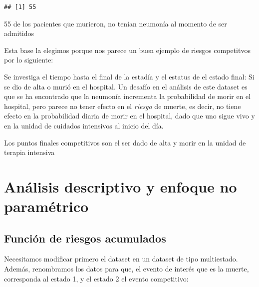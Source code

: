 \documentclass[
]{article}
\newenvironment{Shaded}{\begin{snugshade}}{\end{snugshade}}
\newcommand{\AttributeTok}[1]{\textcolor[rgb]{0.77,0.63,0.00}{#1}}
\newcommand{\CommentTok}[1]{\textcolor[rgb]{0.56,0.35,0.01}{\textit{#1}}}
\newcommand{\DecValTok}[1]{\textcolor[rgb]{0.00,0.00,0.81}{#1}}
\newcommand{\FunctionTok}[1]{\textcolor[rgb]{0.00,0.00,0.00}{#1}}
\newcommand{\NormalTok}[1]{#1}
\newcommand{\OtherTok}[1]{\textcolor[rgb]{0.56,0.35,0.01}{#1}}
\newcommand{\SpecialCharTok}[1]{\textcolor[rgb]{0.00,0.00,0.00}{#1}}
\newcommand{\StringTok}[1]{\textcolor[rgb]{0.31,0.60,0.02}{#1}}
\begin{document}
\begin{verbatim}
## [1] 55
\end{verbatim}

55 de los pacientes que murieron, no tenían neumonía al momento de ser
admitidos

Esta base la elegimos porque nos parece un buen ejemplo de riesgos
competitvos por lo siguiente:

Se investiga el tiempo hasta el final de la estadía y el estatus de el
estado final: Si se dio de alta o murió en el hospital. Un desafío en el
análisis de este dataset es que se ha encontrado que la neumonía
incrementa la probabilidad de morir en el hospital, pero parece no tener
efecto en el \emph{riesgo} de muerte, es decir, no tiene efecto en la
probabilidad diaria de morir en el hospital, dado que uno sigue vivo y
en la unidad de cuidados intensivos al inicio del día.

Los puntos finales competitivos son el ser dado de alta y morir en la
unidad de terapia intensiva

\hypertarget{anuxe1lisis-descriptivo-y-enfoque-no-paramuxe9trico}{%
\section{Análisis descriptivo y enfoque no
paramétrico}\label{anuxe1lisis-descriptivo-y-enfoque-no-paramuxe9trico}}

\hypertarget{funciuxf3n-de-riesgos-acumulados}{%
\subsection{Función de riesgos
acumulados}\label{funciuxf3n-de-riesgos-acumulados}}

Necesitamos modificar primero el dataset en un dataset de tipo
multiestado. Además, renombramos los datos para que, el evento de
interés que es la muerte, corresponda al estado 1, y el estado 2 el
evento competitivo:

\begin{Shaded}
\end{Shaded}
\end{document}
